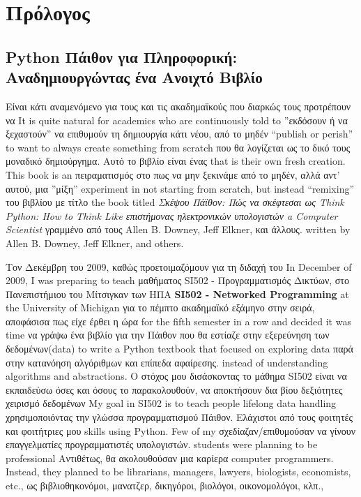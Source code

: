 
\chapter{Πρόλογος}

\section*{Python Πάιθον για Πληροφορική: Αναδημιουργώντας ένα Ανοιχτό Βιβλίο}

Είναι κάτι αναμενόμενο για τους και τις ακαδημαϊκούς που διαρκώς τους προτρέπουν να
It is quite natural for academics who are continuously told to 
''εκδόσουν ή να ξεχαστούν'' να επιθυμούν τη δημιουργία κάτι νέου, από το μηδέν
``publish or perish'' to want to always create something from scratch
που θα λογίζεται ως το δικό τους μοναδικό δημιούργημα. Αυτό το βιβλίο είναι ένας 
that is their own fresh creation.   This book is an 
πειραματισμός στο πως να μην ξεκινάμε από το μηδέν, αλλά αντ' αυτού, μια ''μίξη''
experiment in not starting from scratch, but instead ``remixing''
του βιβλίου με τίτλο
the book titled
\emph{Σκέψου Πάϊθον: Πώς να σκέφτεσαι ως Think Python: How to Think Like
επιστήμονας ηλεκτρονικών υπολογιστών a Computer Scientist}
γραμμένο από τους Allen B. Downey, Jeff Elkner, και άλλους.
written by Allen B. Downey, Jeff Elkner, and others.

Τον Δεκέμβρη του 2009, καθώς προετοιμαζόμουν για τη διδαχή του  
In December of 2009, I was preparing to teach
μαθήματος SI502 - Προγραμματισμός Δικτύων, στο Πανεπιστήμιου του Μίτσιγκαν των ΗΠΑ
{\bf SI502 - Networked Programming} at the University of Michigan
για το πέμπτο ακαδημαϊκό εξάμηνο στην σειρά, αποφάσισα πως είχε έρθει η ώρα
for the fifth semester in a row and decided it was time
να γράψω ένα βιβλίο για την Πάιθον που θα εστίαζε στην εξερεύνηση των δεδομένων(data)
to write a Python textbook that focused on exploring data
παρά στην κατανόηση αλγόριθμων και επίπεδα αφαίρεσης.
instead of understanding algorithms and abstractions.
Ο στόχος μου δισάσκοντας το μάθημα SI502 είναι να εκπαιδεύσω όσες και όσους το παρακολουθούν, να αποκτήσουν δια βίου δεξιότητες χειρισμό δεδομένων 
My goal in SI502 is to teach people lifelong data handling 
χρησιμοποιόντας την γλώσσα προγραμματισμού Πάιθον. Ελάχιστοι από τους φοιτητές και φοιτήτριες μου 
skills using Python.  Few of my
σχεδίαζαν/επιθυμούσαν να γίνουν επαγγελματίες προγραμματιστές υπολογιστών.
students were planning to be professional 
Αντιθέτως, θα ακολουθούσαν μια καρίερα
computer programmers.  Instead, they
planned to be librarians, managers, lawyers, biologists, economists, etc., 
ως βιβλιοθηκονόμοι, μανατζερ, δικηγόροι, βιολόγοι, οικονομολόγοι, κλπ., 

